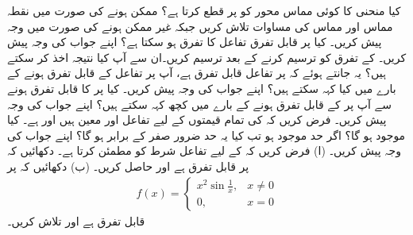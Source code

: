 کیا منحنی  کا کوئی مماس محور  کو  پر قطع کرتا ہے؟ ممکن ہونے کی صورت میں نقطہ مماس اور مماس کی مساوات تلاش کریں جبکہ غیر ممکن ہونے کی صورت میں وجہ پیش کریں۔ 
کیا  پر قابل تفرق تفاعل کا تفرق  ہو سکتا ہے؟ اپنے جواب کی وجہ پیش کریں۔ 
 کے تفرق کو ترسیم کرنے کے بعد  ترسیم کریں۔ان سے آپ کیا نتیجہ اخذ کر سکتے ہیں؟
یہ جانتے ہوئے کہ  پر تفاعل  قابل تفرق ہے، آپ  پر تفاعل  کے  قابل تفرق ہونے کے بارے میں کیا کہہ سکتے ہیں؟ اپنے جواب کی وجہ پیش کریں۔
کیا  پر  کا قابل تفرق ہونے سے آپ  پر  کے قابل تفرق ہونے کے بارے میں کچھ کہہ سکتے ہیں؟ اپنے جواب کی وجہ پیش کریں۔
فرض کریں کہ  کی تمام قیمتوں کے لیے تفاعل  اور  معین ہیں اور  ہے۔ کیا  موجود ہو گا؟ اگر حد موجود ہو تب کیا یہ حد ضرور صفر کے برابر ہو گا؟ اپنے جواب کی وجہ پیش کریں۔
(ا) فرض کریں کہ  کے لیے تفاعل  شرط  کو مطمئن کرتا ہے۔ دکھائیں کہ  پر  قابل تفرق ہے اور  حاصل کریں۔ (ب) دکھائیں کہ  پر
\begin{align*}
f(x)=
\begin{cases}
x^2\sin \frac{1}{x},&x\ne 0\\
0,&x=0
\end{cases}
\end{align*}
قابل تفرق ہے اور  تلاش کریں۔



